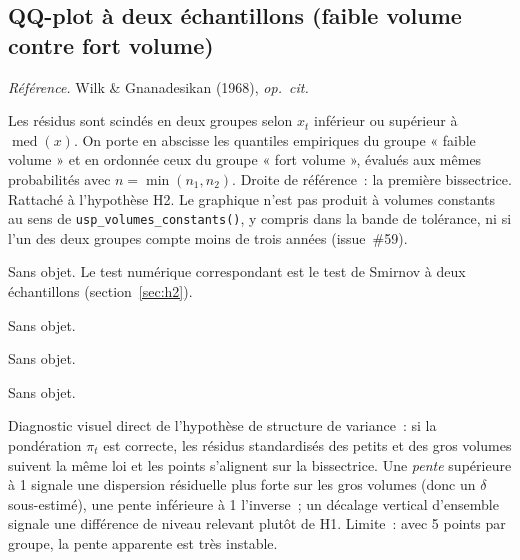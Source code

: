 \documentclass[a4paper,11pt]{article}
\newcommand{\code}[1]{\texttt{\small #1}}
\newcommand{\refl}[1]{{\small\textcolor{maincolor!70!black}{\textit{Référence.} #1}}\par\smallskip}
\newcounter{ficheid}
\newenvironment{fiche}[1]{%
  \stepcounter{ficheid}%
  \phantomsection
  \subsection{#1}%
  \label{fiche:\theficheid}%
}{%
  \end{description}\vspace{0.5em}%
}
\newcommand{\Cadre}{%
  \begin{description}[leftmargin=0pt, style=unboxed, itemsep=3pt, topsep=3pt, parsep=2pt]%
  \item[\textcolor{financeblue}{\textbf{1. Cadre, notations et hypothèses de validité (non testées).}}]}
\newcommand{\Hzero}{\item[\textcolor{financeblue}{\textbf{2. Hypothèse nulle.}}]}
\newcommand{\Stat}{\item[\textcolor{financeblue}{\textbf{3. Statistique de test.}}]}
\newcommand{\Loi}{\item[\textcolor{financeblue}{\textbf{4. Loi sous $H_0$.}}]}
\newcommand{\Pval}{\item[\textcolor{financeblue}{\textbf{5. p-value.}}]}
\newcommand{\Usage}{\item[\textcolor{financeblue}{\textbf{6. Usage et limites.}}]}
\begin{document}
\begin{fiche}{QQ-plot à deux échantillons (faible volume contre fort volume)}
\label{fiche:qqplot-deux-echantillons}%
\refl{Wilk \& Gnanadesikan (1968), \emph{op.\ cit.}}
\Cadre
Les résidus sont scindés en deux groupes selon $x_t$ inférieur ou supérieur à
$\operatorname{med}(x)$. On porte en abscisse les quantiles empiriques du groupe « faible volume »
et en ordonnée ceux du groupe « fort volume », évalués aux mêmes probabilités avec
$n = \min(n_1,n_2)$. Droite de référence~: la première bissectrice. Rattaché à l'hypothèse H2.
Le graphique n'est pas produit à volumes constants au sens de \code{usp\_volumes\_constants()}, y
compris dans la bande de tolérance, ni si l'un des deux groupes compte moins de trois années
(issue~\#59).
\Hzero
Sans objet. Le test numérique correspondant est le test de Smirnov à deux échantillons
(section~\ref{sec:h2}).
\Stat
Sans objet.
\Loi
Sans objet.
\Pval
Sans objet.
\Usage
Diagnostic visuel direct de l'hypothèse de structure de variance~: si la pondération $\pi_t$ est
correcte, les résidus standardisés des petits et des gros volumes suivent la même loi et les points
s'alignent sur la bissectrice. Une \emph{pente} supérieure à 1 signale une dispersion résiduelle
plus forte sur les gros volumes (donc un $\delta$ sous-estimé), une pente inférieure à 1
l'inverse~; un décalage vertical d'ensemble signale une différence de niveau relevant plutôt de
H1. Limite~: avec 5 points par groupe, la pente apparente est très instable.
\end{fiche}
\end{document}
